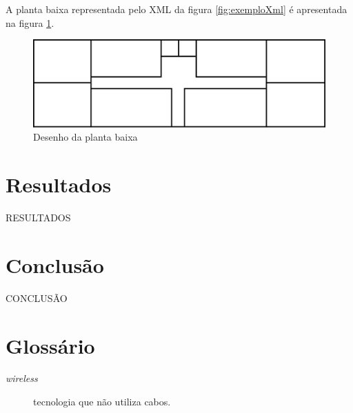 \documentclass[tc,twoside]{iiufrgs}
\begin{document}
A planta baixa representada pelo XML da figura \ref{fig:exemploXml} é apresentada na figura \ref{fig:desenhoPlantaBaixa}.

\begin{figure}[!h]
	\centering
	\includegraphics[scale=0.4]{img/plantaBaixaExemplo.png}
	\caption{Desenho da planta baixa}
	\label{fig:desenhoPlantaBaixa}
\end{figure}

	
\chapter{Resultados} 

RESULTADOS

\chapter{Conclusão} 

CONCLUSÃO

 

\chapter*{Glossário} 

\begin{description} 
	\item[\textit{wireless}] tecnologia que não utiliza cabos.
\end{description} 


\end{document}
